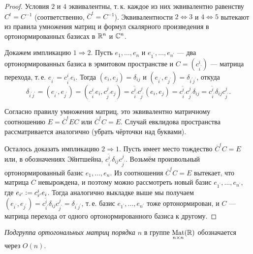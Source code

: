 \begin{proof}
    Условия $2$ и $4$ эквивалентны, т.\,к. каждое из них эквивалентно равенству $C^t = C^{-1}$ (соответственно, $\overline{C}^t = C^{-1}$). Эквивалентности $2 \Leftrightarrow 3$ и $4 \Leftrightarrow 5$ вытекают из правила умножения матриц и формул скалярного произведения в ортонормированных базисах в $\mathbb{R}^n$ и $\mathbb{C}^n$.

    Докажем импликацию $1 \Rightarrow 2$. Пусть $e_1, \ldots, e_n$ и $e_{1^\prime}, \ldots, e_{n^\prime}$ --- два ортонормированных базиса в эрмитовом пространстве и $C = (c^i_{i^\prime})$ --- матрица перехода, т.\,е. $e_{i^\prime} = c^i_{i^\prime}e_i$. Тогда $(e_i, e_j) = \delta_{ij}$ и $(e_{i^\prime}, e_{j^\prime}) = \delta_{i^\prime j^\prime}$, откуда
    \[
        \delta_{i^\prime j^\prime} = (e_{i^\prime}, e_{j^\prime}) = (c^i_{i^\prime}e_i, c^j_{j^\prime}e_j) = \overline{c^i_{i^\prime}}c^j_{j^\prime}(e_i, e_j) = \overline{c^i_{i^\prime}}c^j_{j^\prime}\delta_{ij} = \overline{c^i_{i^\prime}}\delta_{ij}c^j_{j^\prime}.
    \]

    Согласно правилу умножения матриц, это эквивалентно матричному соотношению $E = \overline{C}^tEC$ или $\overline{C}^tC = E$. Случай евклидова пространства рассматривается аналогично (убрать чёрточки над буквами).

    Осталось доказать импликацию $2 \Rightarrow 1$. Пусть имеет место тождество $\overline{C}^tC = E$ или, в обозначениях Эйнтшейна, $\overline{c^i_{i^\prime}}\delta_{ij}c^j_{j^\prime}$. Возьмём произвольный ортонормированный базис $e_1, \ldots, e_n$. Из соотношения $\overline{C}^tC = E$ вытекает, что матрица $C$ невырождена, и поэтому можно рассмотреть новый базис $e_{1^\prime}, \ldots, e_{n^\prime}$, где $e_{i^\prime} \vcentcolon = c^i_{i^\prime}e_i$. Тогда аналогично выкладке выше мы получаем $(e_{i^\prime}, e_{j^\prime}) = \overline{c^i_{i^\prime}}\delta_{ij}c^j_{j^\prime} = \delta_{i^\prime j^\prime}$, т.\,е. базис $e_{1^\prime}, \ldots, e_{n^\prime}$ тоже ортонормирован, и $C$ --- матрица перехода от одного ортонормированного базиса к другому.
\end{proof}

\begin{definition}
    \textit{Подгруппа ортогональных матриц порядка $n$} в группе $\underset{n \times n}{\operatorname{Mat}}(\mathbb{R})$ обозначается через $O(n)$.
\end{definition}

